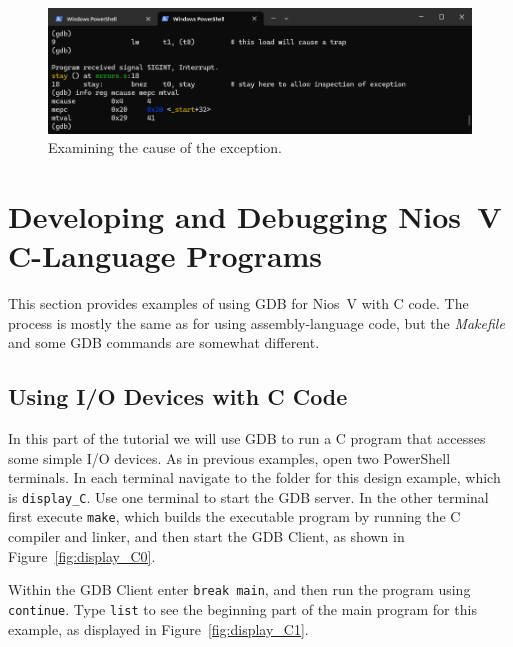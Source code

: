 \documentclass[11pt, twoside, pdftex]{article}
\begin{document}
\begin{figure}[h]
    \begin{center}
        \includegraphics[scale=.6]{figures/errors_s3.png}
        \caption{Examining the cause of the exception.}
        \label{fig:errors_s3}
    \end{center}
\end{figure}

\section{Developing and Debugging Nios~V C-Language Programs}
\label{sec:c-code}

This section provides examples of using GDB for Nios~V with C code. The process is mostly
the same as for using assembly-language code, but the {\it Makefile} and some GDB commands are
somewhat different. 

\subsection{Using I/O Devices with C Code}

In this part of the tutorial we will use GDB to run a C program that accesses some simple 
I/O devices. As in previous examples, open two PowerShell terminals. In each terminal 
navigate to the folder for this design example, which is \texttt{display\_C}. Use one 
terminal to start the GDB server. In the other terminal first execute \texttt{make}, which 
builds the executable program by running the C compiler and linker, and then start the GDB 
Client, as shown in Figure~\ref{fig:display_C0}.

Within the GDB Client enter \texttt{break main}, and then run the program using \texttt{continue}.
Type \texttt{list} to see the beginning part of the main program for this example, as displayed in 
Figure~\ref{fig:display_C1}.
\end{document}
